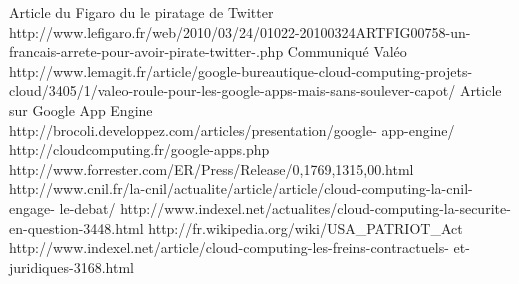 \documentclass[a4paper,12pt]{report}
\begin{document}
\begin{onehalfspace}
	\clearpage
	\renewcommand\bibname{Sitographie}
	\begin{thebibliography}{9}
	  Article du Figaro du le piratage de Twitter http://www.lefigaro.fr/web/2010/03/24/01022-20100324ARTFIG00758-un-francais-arrete-pour-avoir-pirate-twitter-.php
	 Communiqué Valéo http://www.lemagit.fr/article/google-bureautique-cloud-computing-projets- cloud/3405/1/valeo-roule-pour-les-google-apps-mais-sans-soulever-capot/
	 Article sur Google App Engine http://brocoli.developpez.com/articles/presentation/google- app-engine/
	 http://cloudcomputing.fr/google-apps.php
	 http://www.forrester.com/ER/Press/Release/0,1769,1315,00.html
	 http://www.cnil.fr/la-cnil/actualite/article/article/cloud-computing-la-cnil-engage- le-debat/
	 http://www.indexel.net/actualites/cloud-computing-la-securite-en-question-3448.html
	 http://fr.wikipedia.org/wiki/USA\_PATRIOT\_Act 
	 http://www.indexel.net/article/cloud-computing-les-freins-contractuels- et-juridiques-3168.html 
	\end{thebibliography}

	\end{onehalfspace}
\end{document}

